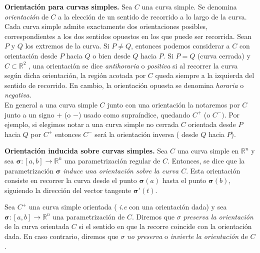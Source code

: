 \begin{definition}\label{orien}  \textbf{Orientaci\'on para curvas simples.}   Sea $C$  una curva simple. Se denomina \emph{orientación} de $C$ a la elección de un sentido de recorrido a lo largo de la curva. Cada curva simple admite exactamente dos orientaciones posibles, correspondientes a los dos sentidos opuestos en los que puede ser recorrida.  Sean  $P$ y $Q$  los extremos de la curva. Si  $P\neq Q$,  entonces podemos considerar a $C$ con orientaci\'on desde $P$ hacia $Q$ o bien desde $Q$ hacia $P$.   Si  $P= Q$  (curva cerrada) y  $C \subset \mathbb{R}^{2}$ 
, una orientación se dice  \emph{antihoraria} o \emph{positiva} si  al recorrer la curva según dicha orientación, la región acotada por $C$  queda siempre a la izquierda del sentido de recorrido. En cambio, la orientación opuesta  se denomina \emph{horaria} o \emph{negativa}.  \\ En general a una curva simple $C$ junto con una orientaci\'on la notaremos por $C$ junto a un signo $+$ (o $-$) usado como  supra\'indice, quedando $C^{+}$  (o $C^{-}).$  Por ejemplo, si elegimos notar a una curva simple no cerrada $C$ orientada desde $P$ hacia $Q$  por  $C^{+}$  entonces  $C^{-}$ ser\'a la orientaci\'on inversa ( desde $Q$ hacia $P$).
\end{definition}


\begin{definition} \textbf{Orientación inducida sobre  curvas simples.} Sea \( C \) una curva simple en \( \mathbb{R}^n \) y sea  
$\boldsymbol{\sigma} : [a,b] \to \mathbb{R}^n$ una parametrización regular de \( C \).  Entonces, se dice que la parametrización \( \boldsymbol{\sigma} \)  \emph{induce una orientación sobre la curva \( C \)}. Esta orientación consiste en recorrer la curva desde el punto \( \boldsymbol{\sigma}(a) \) hasta el punto \( \boldsymbol{\sigma}(b) \), siguiendo la dirección del vector tangente \( \boldsymbol{\sigma}'(t) \).
\end{definition} 

\begin{definition}\label{orien_pre}
Sea $C^{+}$ una curva simple orientada (\textit{ i.e} con una orientaci\'on dada) y sea $\boldsymbol{\sigma} : [a,b] \to \mathbb{R}^n$ una parametrización  de \( C \). Diremos que  $\sigma$ \textit{preserva la orientación} de la curva orientada \( C \) si el sentido en que la recorre coincide con la orientación dada.  En caso contrario, diremos que  $\sigma$ \textit{ no preserva} o  \textit{invierte la orientación} de $C$. 
\end{definition} 




